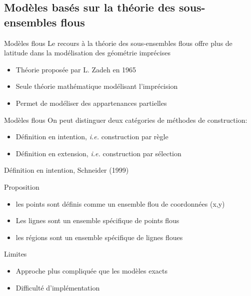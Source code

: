 \documentclass{beamer}
\begin{document}
\subsection{Modèles basés sur la théorie des sous-ensembles flous}
\begin{frame}{Modèles flous}
	Le recours à la théorie des sous-ensembles flous offre plus de latitude dans la modélisation des géométrie imprécises 
		\begin{itemize}
			\item Théorie proposée par L. Zadeh en 1965
			\item Seule théorie mathématique modélisant l'imprécision
			\item Permet de modéliser des appartenances partielles
		\end{itemize}
\end{frame}

\begin{frame}{Modèles \og flous \fg}
	On peut distinguer deux catégories de méthodes de construction: 
	\begin{itemize}
		\item Définition en intention, \emph{i.e.} construction par règle 
		\item Définition en extension, \emph{i.e.} construction par sélection
	\end{itemize}
\end{frame}

\begin{frame}{Définition en intention, Schneider (1999)}
	 \begin{alertblock}{Proposition}
		\begin{itemize}
			\item les points sont définis comme un ensemble flou de coordonnées (x,y)
			\item Les lignes sont un ensemble spécifique de points flous
			\item les régions sont un ensemble spécifique de lignes floues
		\end{itemize}
	\end{alertblock}
	\begin{exampleblock}{Limites}
		\begin{itemize}
		\item Approche plus compliquée que les modèles \og exacts \fg
		\item Difficulté d'implémentation
	\end{itemize}
	\end{exampleblock}
\end{frame}
\end{document}
